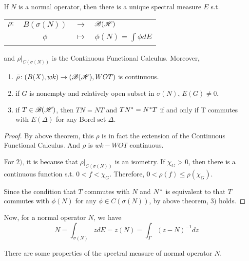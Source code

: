 \documentclass[a4paper,11pt]{report}
\begin{document}
\begin{thm}
	If $N$ is a normal operator, then there is a unique spectral measure $E$ s.t. 
	\begin{center}
		\begin{tabular}{l c c l}
			$\rho \colon$ & $B(\sigma(N))$ & $\longrightarrow$ & $\mathscr{B(H)}$ \\
			~ & $\phi$ & $\longmapsto$ & $\phi(N) = \int \phi dE$
		\end{tabular}
	\end{center}
	and $\rho|_{C(\sigma(N))}$ is the Continuous Functional Calculus. Moreover,
	\begin{enumerate}[label=\arabic*)]
		\item $\tilde{\rho} \colon (B(X),wk) \rightarrow (\mathscr{B(H)},WOT)$ is continuous.
		\item if $G$ is nonempty and relatively open subset in $\sigma(N)$, $E(G) \neq 0$.
		\item if $T \in \mathscr{B(H)}$, then $TN=NT$ and $TN^{*}=N^{*}T$ if and only if T commutes with $E(\Delta)$ for any Borel set $\Delta$.
	\end{enumerate}
\end{thm}
\begin{proof}
	By above theorem, this $\rho$ is in fact the extension of the Continuous Functional Calculus. And $\rho$ is $wk-WOT$ continuous. 
	\item For $2)$, it is because that $\rho|_{C(\sigma(N))}$ is an isometry. If $\chi_{G} > 0$, then there is a continuous function s.t. $0<f<\chi_{G}$. Therefore, $0 < \rho(f) \leqslant \rho(\chi_{G})$.
	\item Since the condition that $T$ commutes with $N$ and $N^{*}$ is equivalent to that $T$ commutes with $\phi(N)$ for any $\phi \in C(\sigma(N))$, by above theorem, $3)$ holds.
\end{proof}
\begin{rem}
	Now, for a normal operator $N$, we have
	\begin{equation*}
		N = \int_{\sigma(N)} z dE = z(N) = \int_{\Gamma} (z-N)^{-1} dz
	\end{equation*}
\end{rem}

There are some properties of the spectral measure of normal operator $N$.
\end{document}
